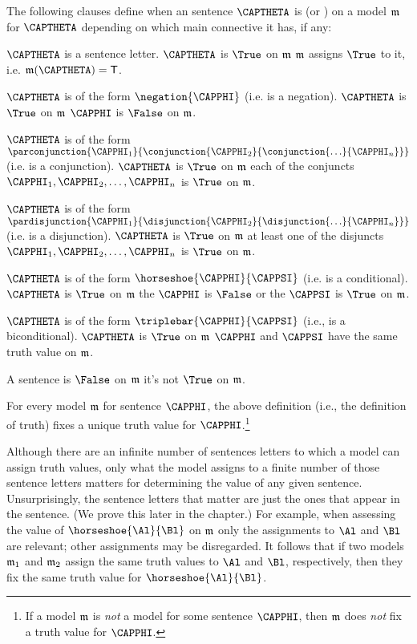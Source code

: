\begin{majorILnc}{} The following clauses define when an \GSL{} sentence $\CAPTHETA$ is \nidf{$\True$} (or \nidf{$\False$}) on a model $\mathfrak{m}$ for $\CAPTHETA$ depending on which main connective it has, if any:
\begin{cenumerate}
\item $\CAPTHETA$ is a sentence letter. $\CAPTHETA$ is $\True$ on $\mathfrak{m}$ \Iff $\mathfrak{m}$ assigns $\True$ to it, i.e. $\IntA(\CAPTHETA)=\TrueB$.
\item $\CAPTHETA$ is of the form $\negation{\CAPPHI}$ (i.e. is a negation). $\CAPTHETA$ is $\True$ on $\mathfrak{m}$ \Iff $\CAPPHI$ is $\False$ on $\mathfrak{m}$.
\item\label{GSL true conjunction} $\CAPTHETA$ is of the form $\parconjunction{\CAPPHI_1}{\conjunction{\CAPPHI_2}{\conjunction{\ldots}{\CAPPHI_{\integer{n}}}}}$ (i.e. is a conjunction).   $\CAPTHETA$ is $\True$ on $\mathfrak{m}$ \Iff each of the conjuncts $\CAPPHI_1, \CAPPHI_2, \ldots, \CAPPHI_n$ is $\True$ on $\mathfrak{m}$.
\item $\CAPTHETA$ is of the form $\pardisjunction{\CAPPHI_1}{\disjunction{\CAPPHI_2}{\disjunction{\ldots}{\CAPPHI_{\integer{n}}}}}$ (i.e. is a disjunction). $\CAPTHETA$ is $\True$ on $\mathfrak{m}$ \Iff at least one of the disjuncts $\CAPPHI_1, \CAPPHI_2, \ldots, \CAPPHI_n$ is $\True$ on $\mathfrak{m}$.
\item\label{GSL true horseshoe} $\CAPTHETA$ is of the form $\horseshoe{\CAPPHI}{\CAPPSI}$ (i.e. is a conditional). $\CAPTHETA$ is $\True$ on $\mathfrak{m}$ \Iff the  $\CAPPHI$ is $\False$ or the  $\CAPPSI$ is $\True$ on $\mathfrak{m}$.
\item $\CAPTHETA$ is of the form $\triplebar{\CAPPHI}{\CAPPSI}$ (i.e., is a biconditional). $\CAPTHETA$ is $\True$ on $\mathfrak{m}$ \Iff $\CAPPHI$ and $\CAPPSI$ have the same truth value on $\mathfrak{m}$.
\item A sentence is $\False$ on $\mathfrak{m}$ \Iff it's not $\True$ on $\mathfrak{m}$.
\end{cenumerate}
\end{majorILnc}

For every model $\mathfrak{m}$ for sentence $\CAPPHI$, the above definition (i.e., the definition of truth) fixes a unique truth value for $\CAPPHI$.\footnote{If a model $\mathfrak{m}$ is \emph{not} a model for some \GSL{} sentence $\CAPPHI$, then $\mathfrak{m}$ does \emph{not} fix a truth value for $\CAPPHI$.}

Although there are an infinite number of \GSL{} sentences letters to which a model can assign truth values, only what the model assigns to a finite number of those sentence letters matters for determining the value of any given sentence.  
Unsurprisingly, the sentence letters that matter are just the ones that appear in the sentence. (We prove this later in the chapter.) 
For example, when assessing the value of $\horseshoe{\Al}{\Bl}$ on $\mathfrak{m}$ only the assignments to $\Al$ and $\Bl$ are relevant; other assignments may be disregarded. It follows that if two models $\mathfrak{m}_1$ and $\mathfrak{m}_2$ assign the same truth values to $\Al$ and $\Bl$, respectively, then they fix the same truth value for $\horseshoe{\Al}{\Bl}$. 

